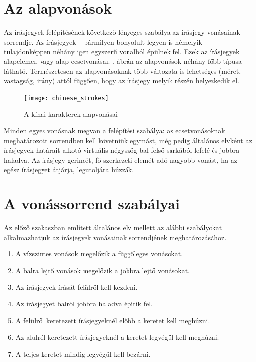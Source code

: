 \section{Az alapvonások}

Az írásjegyek felépítésének következő lényeges szabálya az írásjegy vonásainak sorrendje. Az írásjegyek – bármilyen bonyolult legyen is némelyik – tulajdonképpen néhány igen egyszerű vonalból épülnek fel. Ezek az írásjegyek alapelemei, vagy alap-ecsetvonásai. . ábrán az alapvonások néhány főbb típusa látható. Természetesen az alapvonásoknak több változata is lehetséges (méret, vastagság, irány) attól függően, hogy az írásjegy melyik részén helyezkedik el.

\begin{figure}
	\centering
	\texttt{[image: chinese\_strokes]}
	\caption{A kínai karakterek alapvonásai}
	\label{fig:alapvonasok}
\end{figure}

Minden egyes vonásnak megvan a felépítési szabálya: az ecsetvonásoknak meghatározott sorrendben kell követniük egymást, még pedig általános elvként az írásjegyek határait alkotó virtuális négyszög bal felső sarkából lefelé és jobbra haladva. Az írásjegy gerincét, fő szerkezeti elemét adó nagyobb vonást, ha az egész írásjegyet átjárja, legutoljára húzzák.

\section{A vonássorrend szabályai}

Az előző szakaszban említett általános elv mellett az alábbi szabályokat alkalmazhatjuk az írásjegyek vonásainak sorrendjének meghatározásához.
\begin{enumerate}
	\item A vízszintes vonások megelőzik a függőleges vonásokat.
	\item A balra lejtő vonások megelőzik a jobbra lejtő vonásokat. 
	\item Az írásjegyek írását felülről kell kezdeni. 
	\item Az írásjegyet balról jobbra haladva építik fel. 
	\item A felülről keretezett írásjegyeknél előbb a keretet kell meghúzni. 
	\item Az alulról keretezett írásjegyeknél a keretet legvégül kell meghúzni. 
	\item A teljes keretet mindig legvégül kell bezárni.
\end{enumerate}

